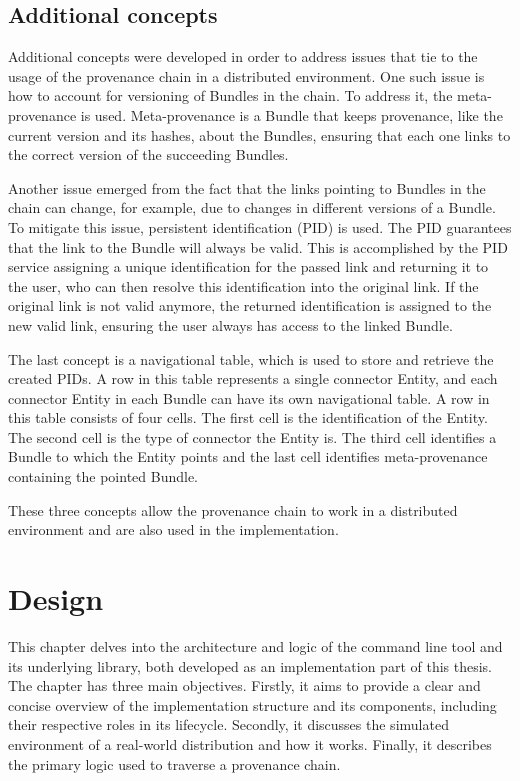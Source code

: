 \documentclass[
  digital,     %
  oneside,     %
  nosansbold,  %
  nocolorbold, %
  lof,         %
  lot,         %
]{fithesis4}
\begin{document}
\section{Additional concepts}
Additional concepts were developed in order to address issues that tie to the usage of the provenance chain in a distributed environment. One such issue is how to account for versioning of Bundles in the chain. To address it, the meta-provenance is used. Meta-provenance is a Bundle that keeps provenance, like the current version and its hashes, about the Bundles, ensuring that each one links to the correct version of the succeeding Bundles. \cite{metaprov}

Another issue emerged from the fact that the links pointing to Bundles in the chain can change, for example, due to changes in different versions of a Bundle. To mitigate this issue, persistent identification (PID) is used. The PID guarantees that the link to the Bundle will always be valid. This is accomplished by the PID service assigning a unique identification for the passed link and returning it to the user, who can then resolve this identification into the original link. If the original link is not valid anymore, the returned identification is assigned to the new valid link, ensuring the user always has access to the linked Bundle.

The last concept is a navigational table, which is used to store and retrieve the created PIDs. A row in this table represents a single connector Entity, and each connector Entity in each Bundle can have its own navigational table. A row in this table consists of four cells. The first cell is the identification of the Entity. The second cell is the type of connector the Entity is. The third cell identifies a Bundle to which the Entity points and the last cell identifies meta-provenance containing the pointed Bundle.

These three concepts allow the provenance chain to work in a distributed environment and are also used in the implementation.


\chapter{Design}
\shorthandoff{-}
This chapter delves into the architecture and logic of the command line tool and its underlying library, both developed as an implementation part of this thesis. The chapter has three main objectives. Firstly, it aims to provide a clear and concise overview of the implementation structure and its components, including their respective roles in its lifecycle. Secondly, it discusses the simulated environment of a real-world distribution and how it works. Finally, it describes the primary logic used to traverse a provenance chain. 
\shorthandon{-}
\end{document}
